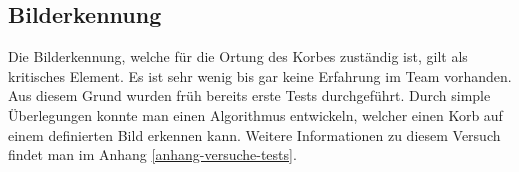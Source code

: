 \subsection{Bilderkennung}
Die Bilderkennung, welche für die Ortung des Korbes zuständig ist, gilt als kritisches Element. Es ist sehr wenig bis gar keine Erfahrung im Team vorhanden. Aus diesem Grund wurden früh bereits erste Tests durchgeführt. Durch simple Überlegungen konnte man einen Algorithmus entwickeln, welcher einen Korb auf einem definierten Bild erkennen kann. Weitere Informationen zu diesem Versuch findet man im Anhang \ref{anhang-versuche-tests}.